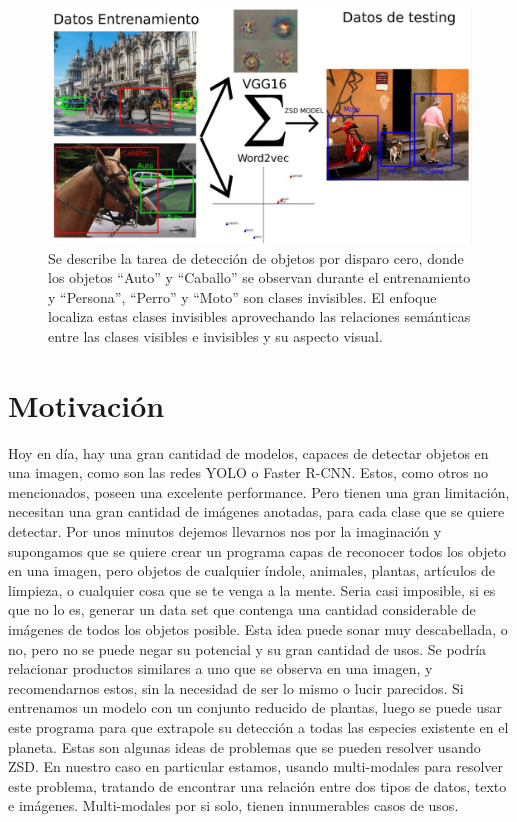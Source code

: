 \begin{figure}[H]
	\centering
	\includegraphics[width=1\textwidth]{img/Modelo.jpg}
	\caption{Se describe la tarea de detección de objetos por disparo cero, donde los objetos ``Auto'' y ``Caballo'' se observan  durante el entrenamiento y ``Persona'', ``Perro'' y ``Moto'' son clases invisibles. El enfoque localiza estas clases invisibles aprovechando las relaciones semánticas entre las clases visibles e invisibles y su aspecto visual.}
	\label{fig:EvolucionILSVRC}
\end{figure}
\section{Motivación}
Hoy en día, hay una gran cantidad de modelos, capaces de detectar objetos en una imagen, como son las redes YOLO o Faster R-CNN. Estos, como otros no mencionados, poseen una excelente performance. Pero tienen una gran limitación, necesitan una gran cantidad de imágenes anotadas, para cada clase que se quiere detectar. Por unos minutos dejemos llevarnos nos por la imaginación y supongamos que se quiere crear un programa capas de reconocer todos los objeto en una imagen, pero objetos de cualquier índole, animales, plantas, artículos de limpieza, o cualquier cosa que se te venga a la mente. Seria casi imposible, si es que no lo es, generar un data set que contenga una cantidad considerable de imágenes de todos los objetos posible. Esta idea puede sonar muy descabellada, o no, pero no se puede negar su potencial y su gran cantidad de usos. Se podría relacionar productos similares a uno que se observa en una imagen, y recomendarnos estos, sin la necesidad de ser lo mismo o lucir parecidos. Si entrenamos un modelo con un conjunto reducido de plantas, luego se puede usar este programa para que extrapole su detección a todas las especies existente en el planeta. Estas son algunas ideas de problemas que se pueden resolver usando ZSD. En nuestro caso en particular estamos, usando multi-modales para resolver este problema, tratando de encontrar una relación entre dos tipos de datos, texto e imágenes. Multi-modales por si solo, tienen innumerables casos de usos.